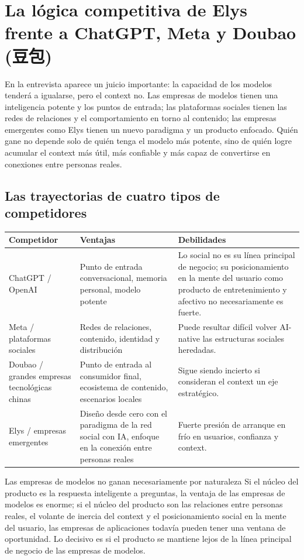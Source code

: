 \section{La lógica competitiva de Elys frente a ChatGPT, Meta y Doubao (豆包)}

En la entrevista aparece un juicio importante: la capacidad de los modelos tenderá a igualarse, pero el context no. Las empresas de modelos tienen una inteligencia potente y los puntos de entrada; las plataformas sociales tienen las redes de relaciones y el comportamiento en torno al contenido; las empresas emergentes como Elys tienen un nuevo paradigma y un producto enfocado. Quién gane no depende solo de quién tenga el modelo más potente, sino de quién logre acumular el context más útil, más confiable y más capaz de convertirse en conexiones entre personas reales.

\subsection{Las trayectorias de cuatro tipos de competidores}

\noindent\begin{longtable}{p{}p{}p{}}
\toprule
Competidor & Ventajas & Debilidades \\
\midrule
ChatGPT / OpenAI & Punto de entrada conversacional, memoria personal, modelo potente & Lo social no es su línea principal de negocio; su posicionamiento en la mente del usuario como producto de entretenimiento y afectivo no necesariamente es fuerte. \\
Meta / plataformas sociales & Redes de relaciones, contenido, identidad y distribución & Puede resultar difícil volver AI-native las estructuras sociales heredadas. \\
Doubao / grandes empresas tecnológicas chinas & Punto de entrada al consumidor final, ecosistema de contenido, escenarios locales & Sigue siendo incierto si consideran el context un eje estratégico. \\
Elys / empresas emergentes & Diseño desde cero con el paradigma de la red social con IA, enfoque en la conexión entre personas reales & Fuerte presión de arranque en frío en usuarios, confianza y context. \\
\bottomrule
\end{longtable}

\begin{warningbox}{Las empresas de modelos no ganan necesariamente por naturaleza}
Si el núcleo del producto es la respuesta inteligente a preguntas, la ventaja de las empresas de modelos es enorme; si el núcleo del producto son las relaciones entre personas reales, el volante de inercia del context y el posicionamiento social en la mente del usuario, las empresas de aplicaciones todavía pueden tener una ventana de oportunidad. Lo decisivo es si el producto se mantiene lejos de la línea principal de negocio de las empresas de modelos.
\end{warningbox}

